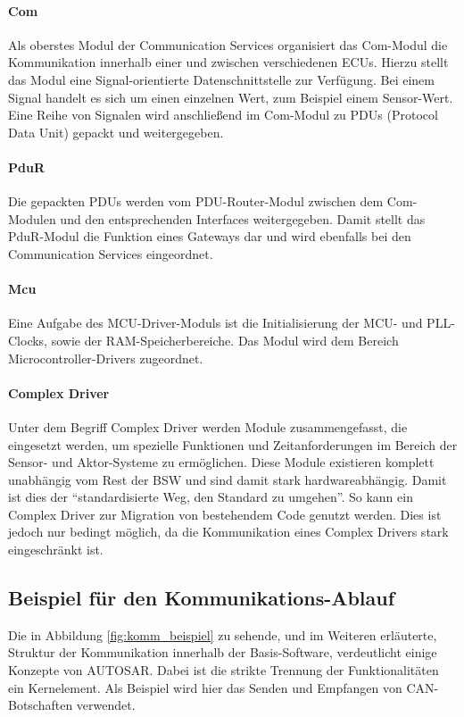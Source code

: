 \documentclass[
  a4paper,					    %
  twoside,
  DIV=calc,     				%
  bibliography=totoc,
  cleardoublepage=empty,
  ngerman,     					%
  final       					%
]{scrbook}
\begin{document}
\paragraph{Com}
Als oberstes Modul der Communication Services organisiert das Com-Modul die Kommunikation innerhalb einer und zwischen verschiedenen ECUs. Hierzu stellt das Modul eine Signal-orientierte Datenschnittstelle zur Verfügung. Bei einem Signal handelt es sich um einen einzelnen Wert, zum Beispiel einem Sensor-Wert. Eine Reihe von Signalen wird anschließend im Com-Modul zu PDUs (Protocol Data Unit) gepackt und weitergegeben.

\paragraph{PduR}
Die gepackten PDUs werden vom PDU-Router-Modul zwischen dem Com-Modulen und den entsprechenden Interfaces weitergegeben. Damit stellt das PduR-Modul die Funktion eines Gateways dar und wird ebenfalls bei den Communication Services eingeordnet.

\paragraph{Mcu}
Eine Aufgabe des MCU-Driver-Moduls ist die Initialisierung der MCU- und PLL-Clocks, sowie der RAM-Speicherbereiche. Das Modul wird dem Bereich Microcontroller-Drivers zugeordnet.

\paragraph{Complex Driver}
Unter dem Begriff Complex Driver werden Module zusammengefasst, die eingesetzt werden, um spezielle Funktionen und Zeitanforderungen im Bereich der Sensor- und Aktor-Systeme zu ermöglichen. Diese Module existieren komplett unabhängig vom Rest der BSW und sind damit stark hardwareabhängig. Damit ist dies der "`standardisierte Weg, den Standard zu umgehen"'\cite[Seite 227]{SE_Autosar}. So kann ein Complex Driver zur Migration von bestehendem Code genutzt werden. Dies ist jedoch nur bedingt möglich, da die Kommunikation eines Complex Drivers stark eingeschränkt ist.


\subsection{Beispiel für den Kommunikations-Ablauf}
\label{sec:beispiel_komm}
Die in Abbildung \ref{fig:komm_beispiel} zu sehende, und im Weiteren erläuterte, Struktur der Kommunikation innerhalb der Basis-Software, verdeutlicht einige Konzepte von AUTOSAR. Dabei ist die strikte Trennung der Funktionalitäten ein Kernelement. Als Beispiel wird hier das Senden und Empfangen von CAN-Botschaften verwendet.
\end{document}
